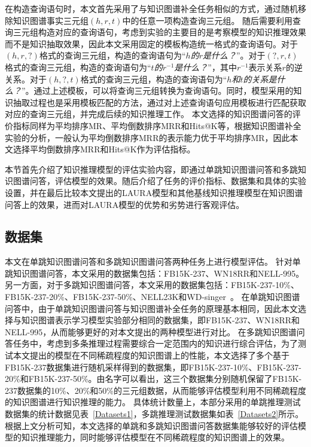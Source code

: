 \documentclass[algorithmlist, AutoFakeBold, AutoFakeSlant, figurelist, tablelist, nomlist, masters]{seuthesix}
\begin{document}
在构造查询语句时，本文首先采用了与知识图谱补全任务相似的方式，通过随机移除知识图谱事实三元组$(h, r, t)$中的任意一项构造查询三元组。
随后需要利用查询三元组构造对应的查询语句，考虑到实验的主要目的是考察模型的知识推理效果而不是知识抽取效果，因此本文采用固定的模板构造统一格式的查询语句。对于$(h, r, ?)$格式的查询三元组，构造的查询语句为“\textit{$h$的$r$是什么？}”。对于$(?, r, t)$格式的查询三元组，构造的查询语句为“\textit{$t$的$r^{-1}$是什么？}”，其中$r^{-1}$表示关系$r$的逆关系。对于$(h, ?, t)$格式的查询三元组，构造的查询语句为“\textit{$h$和$t$的关系是什么？}”。通过上述模板，可以将查询三元组转换为查询语句。同时，模型采用的知识抽取过程也是采用模板匹配的方法，通过对上述查询语句应用模板进行匹配获取对应的查询三元组，并完成后续的知识推理工作。
本文选择的知识图谱问答的评价指标同样为平均排序MR、平均倒数排序MRR和Hits@K等，根据知识图谱补全实验的分析，一般认为平均倒数排序MRR的表示能力优于平均排序MR，因此本文选择平均倒数排序MRR和Hits@K作为评估指标。

本节首先介绍了知识推理模型的评估实验内容，即通过单跳知识图谱问答和多跳知识图谱问答，评估模型的效果。随后介绍了任务的评价指标、数据集和具体的实验设置，并在最后比较本文提出的LAURA模型和其他基线知识推理模型在知识图谱问答上的效果，进而对LAURA模型的优势和劣势进行客观评估。

\subsection{数据集}
本文在单跳知识图谱问答和多跳知识图谱问答两种任务上进行模型评估。
针对单跳知识图谱问答，本文采用的数据集包括：FB15K-237、WN18RR和NELL-995。
另一方面，对于多跳知识图谱问答，本文采用的数据集包括：FB15K-237-10\%、FB15K-237-20\%、FB15K-237-50\%、NELL23K和WD-singer~\cite{lv2020dynamic}。
在单跳知识图谱问答中，由于单跳知识图谱问答与知识图谱补全任务的原理基本相同，因此本文选择与知识图谱表示学习模型实验部分相同的数据集，即FB15K-237、WN18RR和NELL-995，从而能够更好的对本文提出的两种模型进行对比。
在多跳知识图谱问答任务中，考虑到多条推理过程需要综合一定范围内的知识进行综合评估，为了测试本文提出的模型在不同稀疏程度的知识图谱上的性能，本文选择了多个基于FB15K-237数据集进行随机采样得到的数据集，即FB15K-237-10\%、FB15K-237-20\%和FB15K-237-50\%。由名字可以看出，这三个数据集分别随机保留了FB15K-237数据集的10\%、20\%和50\%的三元组数据，从而能够评估模型利用不同稀疏程度的知识图谱进行知识推理的能力。
具体统计数量上，本部分采用的单跳推理测试数据集的统计数据见表~\ref{Datasets1}，多跳推理测试数据集如表~\ref{Datasets2}所示。根据上文分析可知，本文选择的单跳和多跳知识图谱问答数据集能够较好的评估模型的知识推理能力，同时能够评估模型在不同稀疏程度的知识图谱上的效果。
\end{document}
